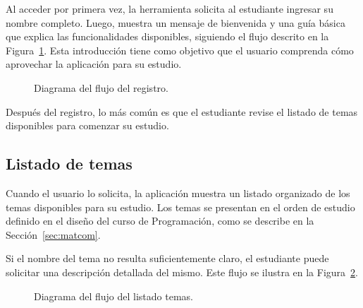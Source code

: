 Al acceder por primera vez, la herramienta solicita al estudiante ingresar su nombre completo. Luego, muestra un mensaje de bienvenida y una guía básica que explica las funcionalidades disponibles, siguiendo el flujo descrito en la Figura~\ref{fig:register}. Esta introducción tiene como objetivo que el usuario comprenda cómo aprovechar la aplicación para su estudio.

\begin{figure}[h!]
  \centering
  \caption{Diagrama del flujo del registro.}\label{fig:register}
\end{figure}

Después del registro, lo más común es que el estudiante revise el listado de temas disponibles para comenzar su estudio.

\subsection{Listado de temas}

Cuando el usuario lo solicita, la aplicación muestra un listado organizado de los temas disponibles para su estudio. Los temas se presentan en el orden de estudio definido en el diseño del curso de Programación, como se describe en la Sección~\ref{sec:matcom}.

Si el nombre del tema no resulta suficientemente claro, el estudiante puede solicitar una descripción detallada del mismo. Este flujo se ilustra en la Figura~\ref{fig:topics}.

\begin{figure}[h!]
  \centering
\caption{Diagrama del flujo del listado temas.}\label{fig:topics}
\end{figure}

